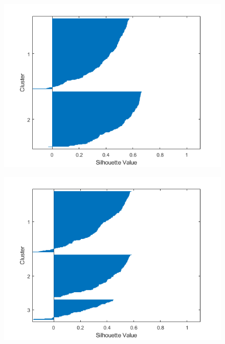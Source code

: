 \documentclass[sn-mathphys,Numbered]{sn-jnl}
\begin{document}
\begin{figure}[H]
\centering
\begin{minipage}{.5\textwidth}
  \centering
  \includegraphics[width=\linewidth]{silhouette_medians_2}
  \label{fig:test1}
\end{minipage}%
\begin{minipage}{.5\textwidth}
  \centering
  \includegraphics[width=\linewidth]{silhouette_medians_3}
  \label{fig:test2}
\end{minipage}
\end{figure}
\end{document}
